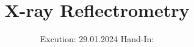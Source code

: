 

\subject{V44}
\title{X-ray Reflectrometry}
\date{%
  Excution: 29.01.2024
  \hspace{3em}
  Hand-In: 
}



\maketitle
\thispagestyle{empty}
\tableofcontents
\newpage
\setcounter{page}{1}







\printbibliography{}


